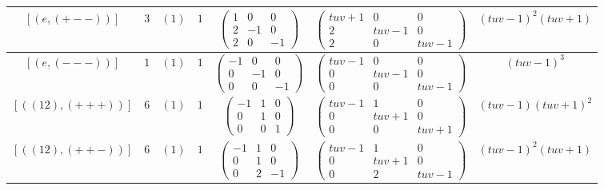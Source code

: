 \documentclass[11pt,english]{amsart}
\numberwithin{equation}{section}
\numberwithin{figure}{section}
\theoremstyle{plain}
\theoremstyle{plain}
\theoremstyle{definition}
\theoremstyle{remark}
\begin{document}
\begin{itemize}
\begin{table}[H]
\begin{tabular}{|c|c|c|c|c|c|c|}
        $[ (e, (+--)) ]$ & $3$ & $(1)$ & $1$ & 
        $\begin{pmatrix} 1 & 0 & 0 \\ 2 & -1 & 0 \\ 2 & 0 & -1 \end{pmatrix}$ & 
        $\begin{pmatrix} tuv+1 & 0 & 0 \\ 2 & tuv-1 & 0 \\ 2 & 0 & tuv-1 \end{pmatrix}$ & 
        $(tuv-1)^2(tuv+1)$ \\\hline
        
        $[ (e, (---)) ]$ & $1$ & $(1)$ & $1$ & 
        $\begin{pmatrix} -1 & 0 & 0 \\ 0 & -1 & 0 \\ 0 & 0 & -1 \end{pmatrix}$ & 
        $\begin{pmatrix} tuv-1 & 0 & 0 \\ 0 & tuv-1 & 0 \\ 0 & 0 & tuv-1 \end{pmatrix}$ & 
        $(tuv-1)^3$ \\\hline
        
        $[ ((12), (+++)) ]$ & $6$ & $(1)$ & $1$ & 
        $\begin{pmatrix} -1 & 1 & 0 \\ 0 & 1 & 0 \\ 0 & 0 & 1 \end{pmatrix}$ & 
        $\begin{pmatrix} tuv-1 & 1 & 0 \\ 0 & tuv+1 & 0 \\ 0 & 0 & tuv+1 \end{pmatrix}$ & 
        $(tuv-1)(tuv+1)^2$ \\\hline
        
        $[ ((12), (++-)) ]$ & $6$ & $(1)$ & $1$ & 
        $\begin{pmatrix} -1 & 1 & 0 \\ 0 & 1 & 0 \\ 0 & 2 & -1 \end{pmatrix}$ & 
        $\begin{pmatrix} tuv-1 & 1 & 0 \\ 0 & tuv+1 & 0 \\ 0 & 2 & tuv-1 \end{pmatrix}$ & 
        $(tuv-1)^2(tuv+1)$ \\\hline
        

\end{tabular}
\end{table}
\end{itemize}
\end{document}

